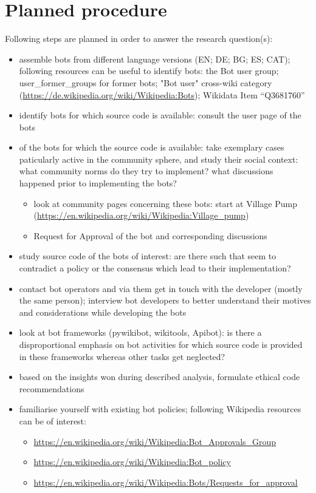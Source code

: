\documentclass[pdftex,a4paper,11pt]{scrartcl}
\begin{document}
\section{Planned procedure}

Following steps are planned in order to answer the research question(s):

\begin{itemize}
    \item assemble bots from different language versions (EN; DE; BG; ES; CAT); following resources can be useful to identify bots: the Bot user group; user\_former\_groups for former bots; "Bot user" cross-wiki category (\url{https://de.wikipedia.org/wiki/Wikipedia:Bots}); Wikidata Item “Q3681760”
    \item identify bots for which source code is available: consult the user page of the bots
    \item of the bots for which the source code is available: take exemplary cases paticularly active in the community sphere, and study their social context: what community norms do they try to implement? what discussions happened prior to implementing the bots?
    \begin{itemize}
        \item look at community pages concerning these bots: start at Village Pump (\url{https://en.wikipedia.org/wiki/Wikipedia:Village_pump})
        \item Request for Approval of the bot and corresponding discussions
    \end{itemize}
    \item study source code of the bots of interest: are there such that seem to contradict a policy or the consensus which lead to their implementation?
    \item contact bot operators and via them get in touch with the developer (mostly the same person); interview bot developers to better understand their motives and considerations while developing the bots
    \item look at bot frameworks (pywikibot, wikitools, Apibot): is there a disproportional emphasis on bot activities for which source code is provided in these frameworks whereas other tasks get neglected?
    \item based on the insights won during described analysis, formulate ethical code recommendations
    \item familiarise yourself with existing bot policies; following Wikipedia resources can be of interest:
    \begin{itemize}
        \item \url{https://en.wikipedia.org/wiki/Wikipedia:Bot_Approvals_Group}
        \item \url{https://en.wikipedia.org/wiki/Wikipedia:Bot_policy}
        \item \url{https://en.wikipedia.org/wiki/Wikipedia:Bots/Requests_for_approval}
    \end{itemize}
\end{itemize}
\end{document}
